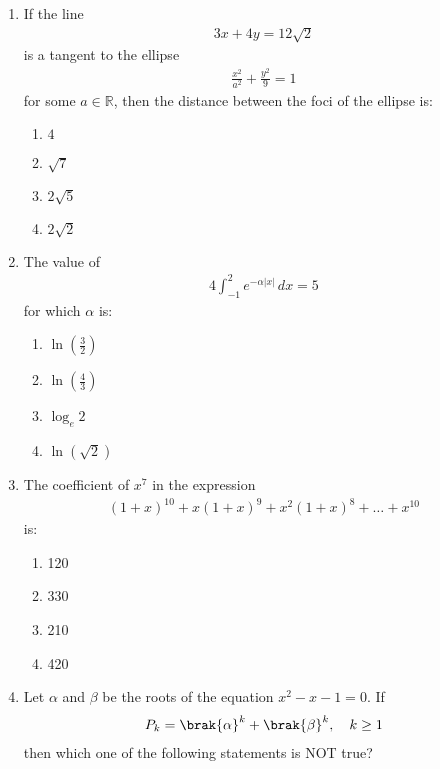 \documentclass{article}
\begin{document}
\begin{enumerate}
\item If the line\begin{align*}3x + 4y = 12\sqrt{2}\end{align*}is a tangent to the ellipse \begin{align*}\frac{x^2}{a^2} + \frac{y^2}{9} = 1\end{align*}for some $a \in \mathbb{R}$, then the distance between the foci of the ellipse is:

\begin{enumerate}
   \item  $4$
   \item  $\sqrt{7}$
   \item  $2\sqrt{5}$
   \item  $2\sqrt{2}$
\end{enumerate}

\item The value of \begin{align*}4 \int_{-1}^{2} e^{-\alpha |x|} \,dx = 5\end{align*}for which $\alpha$ is:

\begin{enumerate}
   \item  $\ln\left(\frac{3}{2}\right)$
   \item  $\ln\left(\frac{4}{3}\right)$
   \item  $\log_e 2$
   \item  $\ln(\sqrt{2})$
\end{enumerate}


\item The coefficient of $x^7$ in the expression\begin{align*}(1 + x)^{10} + x (1 + x)^9 + x^2 (1 + x)^8 + \dots + x^{10} \end{align*}is:

\begin{enumerate}  
   \item  120
   \item  330
   \item  210
   \item  420
\end{enumerate}

\item Let $\alpha$ and $\beta$ be the roots of the equation $x^2 - x - 1 = 0$. If \begin{align*} P_k = \brak{\alpha}^k + \brak{\beta}^k, \quad k \geq 1\end{align*}then which one of the following statements is NOT true?        


\end{enumerate}
\end{document}
